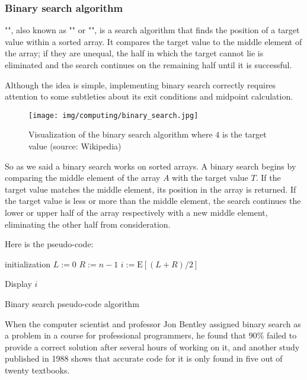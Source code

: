 	\pagebreak
	\subsubsection{Binary search algorithm}
	"", also known as "" or "", is a search algorithm that finds the position of a target value within a sorted array. It compares the target value to the middle element of the array; if they are unequal, the half in which the target cannot lie is eliminated and the search continues on the remaining half until it is successful.

	Although the idea is simple, implementing binary search correctly requires attention to some subtleties about its exit conditions and midpoint calculation.
	\begin{figure}[H]
		\centering
		\texttt{[image: img/computing/binary\_search.jpg]}
		\caption[Visualization of the binary search algorithm]{Visualization of the binary search algorithm where $4$ is the target value (source: Wikipedia)}
	\end{figure}
	
	So as we said a binary search works on sorted arrays. A binary search begins by comparing the middle element of the array $A$ with the target value $T$. If the target value matches the middle element, its position in the array is returned. If the target value is less or more than the middle element, the search continues the lower or upper half of the array respectively with a new middle element, eliminating the other half from consideration.

	Here is the pseudo-code:
	
	\begin{algorithm}[H]
		initialization\;
		$L:=0$\;
		$R:=n-1$\;
		$i:=\text{E}[(L+R)/2]$\;
			
		Display $i$\;
		\caption{Binary search pseudo-code algorithm}
	\end{algorithm}
	When the computer scientist and professor Jon Bentley assigned binary search as a problem in a course for professional programmers, he found that $90\%$ failed to provide a correct solution after several hours of working on it, and another study published in 1988 shows that accurate code for it is only found in five out of twenty textbooks.

